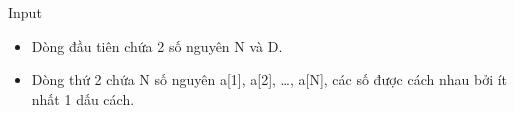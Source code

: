 Input  
\begin{itemize}
	\item     Dòng đầu tiên chứa 2 số nguyên N và D.   
	\item     Dòng thứ 2 chứa N số nguyên a[1], a[2], …, a[N], các số được cách nhau bởi ít nhất 1 dấu cách.   
\end{itemize}
